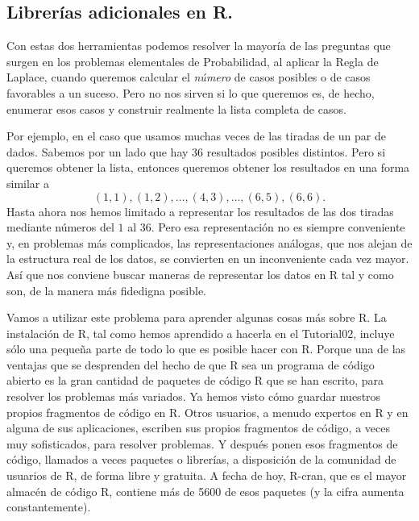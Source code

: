 \documentclass[10pt,a4paper]{article}\usepackage[]{graphicx}\usepackage[]{color}
\newcounter {cont01}
\begin{document}
\subsection{Librerías adicionales en R.}
\label{tut03:subsec:LibreriasAdicionalesR}

Con estas dos herramientas podemos resolver la mayoría de las preguntas que surgen en los problemas elementales de Probabilidad, al aplicar la Regla de Laplace, cuando queremos calcular el {\em número} de casos posibles o de casos favorables a un suceso. Pero no nos sirven si lo que queremos es, de hecho, enumerar esos casos y construir realmente la lista completa de casos.

Por ejemplo, en el caso que usamos muchas veces de las tiradas de un par de dados. Sabemos por un lado que hay 36 resultados posibles distintos. Pero si queremos obtener la lista, entonces queremos obtener los resultados en una forma similar a
\[(1,1) , (1,2), \ldots, (4,3), \ldots,(6,5), (6,6).\]
Hasta ahora nos hemos limitado a representar los resultados de las dos tiradas mediante números del $1$ al $36$. Pero  esa representación no es siempre conveniente y, en problemas más complicados, las representaciones análogas, que nos alejan de la estructura real de los datos, se convierten en un inconveniente cada vez mayor. Así que nos conviene buscar maneras de representar los datos en R tal y como son, de la manera más fidedigna posible.

Vamos a utilizar este problema para aprender algunas cosas más sobre R. La instalación de R, tal como hemos aprendido a hacerla en el Tutorial02, incluye sólo una pequeña parte de todo lo que es posible hacer con R. Porque una de las ventajas que se desprenden del hecho de que R sea un programa de código abierto es la gran cantidad de paquetes de código R que se han escrito, para resolver los problemas más variados. Ya hemos visto cómo guardar nuestros propios fragmentos de código en R. Otros usuarios, a menudo expertos en R y en alguna de sus aplicaciones, escriben sus propios fragmentos de código, a veces muy sofisticados, para resolver problemas. Y después ponen esos fragmentos de código, llamados a veces paquetes o librerías,  a disposición de la comunidad de usuarios de R, de forma libre y gratuita. A fecha de hoy, R-cran, que es el mayor almacén de código R, contiene más de 5600 de esos paquetes (y la cifra aumenta constantemente).
\end{document}
